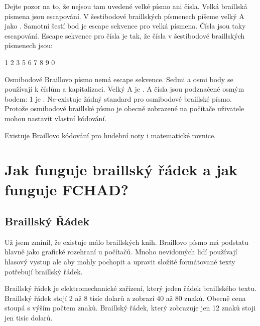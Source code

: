Dejte pozor na to, že nejsou tam uvedené velké písmo ani čísla. Velká braillská písmena jsou escapování. V šestibodové braillských písmenech píšeme velký A jako
. Samotní šestí bod je escape sekvence pro velká písmena. Čísla jsou taky escapování. Escape sekvence pro čísla je
tak, že čísla v šestibodové braillských písmenech jsou:

1
2
3
5
6
7
8
9
0

Osmibodové Braillovo písmo nemá escape sekvence.  Sedmi a osmi body se používají k číslům a kapitalizaci. Velký A je
. A čísla jsou podznačené osmým bodem: 1 je
. Ne-existuje žádný standard pro osmibodové braillské písmo\citep{6dotbraille}.  Protože osmibodové braillské písmo je obecně zobrazené na počítače uživatele mohou nastavit vlastní kódování.

Existuje Braillovo kódování pro hudební noty i matematické rovnice.

\section{Jak funguje braillský řádek a jak funguje FCHAD?}

\subsection{Braillský Řádek}

Už jsem zmínil, že existuje málo braillských knih. Braillovo písmo má podstatu hlavně jako grafické rozehraní u počítačů.  Mnoho nevidomých lidí používají hlasový vystup ale aby mohly pochopit a upravit složité formátované texty potřebují braillský řádek.

Braillský řádek je elektromechanické zařízení, který  jeden řádek braillského textu.  Braillský řádek stojí 2 až 8 tisíc dolarů a zobrazí 40 až 80 znaků.  Obecně cena stoupá s výším počtem znaků.  Braillský řádek, který zobrazuje jen 12 znaků stoji jen tisíc dolarů\citep{perkinsdisplays}.

